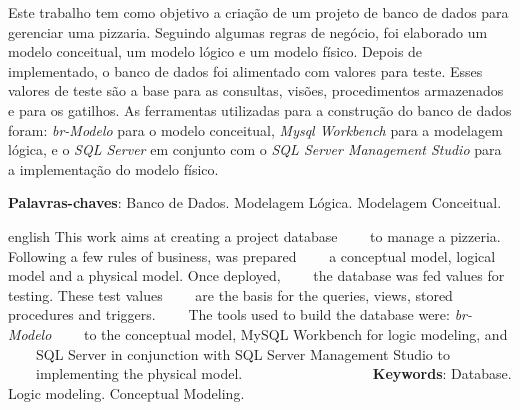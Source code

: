 \documentclass[
	12pt,				%
	openright,			%
	oneside,			%
	a4paper,			%
	chapter=TITLE,		%
	section=TITLE,		%
	english,			%
	brazil				%
	]{abntex2}
\begin{document}


\setlength{\absparsep}{18pt} %
\begin{resumo}
    Este trabalho tem como objetivo a criação de um projeto de banco de dados 
    para gerenciar uma pizzaria. Seguindo algumas regras de negócio, foi elaborado 
    um modelo conceitual, um modelo lógico e um modelo físico. Depois de implementado, 
    o banco de dados foi alimentado com valores para teste. Esses valores de teste 
    são a base para as consultas, visões, procedimentos armazenados e para os gatilhos.
    As ferramentas utilizadas para a construção do banco de dados foram: \textit{br-Modelo} 
    para o modelo conceitual, \textit{Mysql Workbench} para a modelagem lógica, e o 
    \textit{SQL Server} em conjunto com o \textit{SQL Server Management Studio} para a 
    implementação do modelo físico.
    
    \noindent
    
    \textbf{Palavras-chaves}: Banco de Dados. Modelagem Lógica. Modelagem Conceitual.
\end{resumo}

\begin{resumo}[Abstract]
 \begin{otherlanguage*}{english}
    This work aims at creating a project database
    to manage a pizzeria. Following a few rules of business, was prepared
    a conceptual model, logical model and a physical model. Once deployed,
    the database was fed values ​​for testing. These test values
    are the basis for the queries, views, stored procedures and triggers.
    The tools used to build the database were: \textit{br-Modelo}
    to the conceptual model, MySQL Workbench for logic modeling, and
    SQL Server in conjunction with SQL Server Management Studio to
    implementing the physical model.
    
    \noindent    
     \textbf {Keywords}: Database. Logic modeling. Conceptual Modeling.
   \vspace{\onelineskip}
 \end{otherlanguage*}
\end{resumo}

\listoffigures*
\cleardoublepage

\listoftables*
\cleardoublepage
\end{document}
